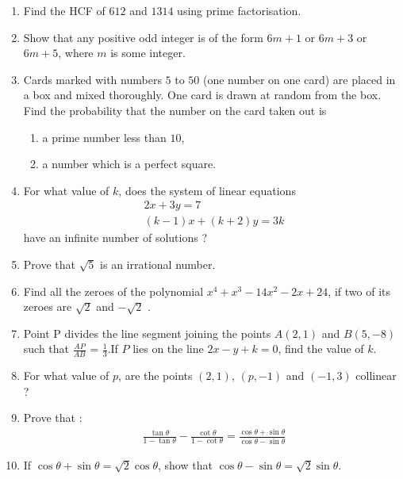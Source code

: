 \documentclass[2pt,-letter paper]{article}
\providecommand{\brak}[1]{\ensuremath{\left(#1\right)}}
\begin{document}
\begin{enumerate}
\item Find the HCF of $612$ and $1314$ using prime factorisation.

\item Show that any positive odd integer is of the form $6m + 1$ or $6m + 3$ or $6m + 5$, where $m$ is some integer.

\item Cards marked with numbers $5$ to $50$ (one number on one card) are placed in a box and mixed thoroughly. One card is drawn at random from the box. Find the probability that the number on the card taken out is \begin{enumerate}
    \item a prime number less than $10$,  
    \item a number which is a perfect square.
\end{enumerate}

\item For what value of $k$, does the system of linear equations\\
\begin{align*}
   2x + 3y = 7\\
 \brak{k - 1} x + \brak{k + 2} y = 3k
\end{align*}
have an infinite number of solutions ?

\item Prove that ${\sqrt 5}$ is an irrational number.

\item Find all the zeroes of the polynomial $x^4 + x^3- 14x^2 -2x + 24$, if two of its zeroes are $\sqrt2$
and $-\sqrt 2$ .

\item Point P divides the line segment joining the points $A\brak{2, 1}$ and $B\brak{5, -8}$ such that $\frac{AP}{AB}$ = $\frac{1}{3}$.If $P$ lies on the line $2x - y + k = 0$, find the value of $k$.

\item For what value of $p$, are the points $\brak{2, 1}$, $\brak{p,- 1}$ and $\brak{- 1, 3}$ collinear ?

\item Prove that :
\begin{align*}
   {\frac{\tan\theta}{1-\tan\theta}} - {\frac{\cot\theta}{1-\cot\theta}}={\frac{\cos\theta+ \sin\theta}{\cos\theta-\sin\theta}}
\end{align*} 

\item If ${\cos\theta + \sin\theta} = {\sqrt 2}{\cos\theta}$, show that ${\cos\theta - \sin\theta} = {\sqrt 2}{\sin\theta}$.


\end{enumerate}
\end{document}
